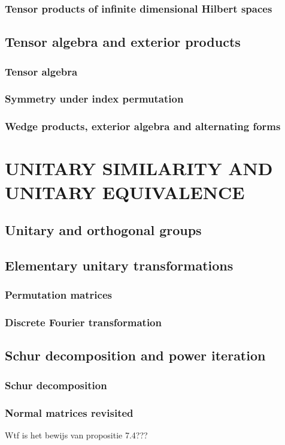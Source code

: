\documentclass[a4paper,twoside]{article}
\theoremstyle{definition}
\theoremstyle{plain}
\begin{document}
\subsubsection{Tensor products of infinite dimensional Hilbert spaces}
\subsection{Tensor algebra and exterior products}
\subsubsection{Tensor algebra}
\subsubsection{Symmetry under index permutation}
\subsubsection{Wedge products, exterior algebra and alternating forms}

\section{UNITARY SIMILARITY AND UNITARY EQUIVALENCE}
\subsection{Unitary and orthogonal groups}
\subsection{Elementary unitary transformations}
\subsubsection{Permutation matrices}
\subsubsection{Discrete Fourier transformation}
\subsection{Schur decomposition and power iteration}
\subsubsection{Schur decomposition}
\subsubsection{Normal matrices revisited}
Wtf is het bewijs van propositie 7.4???
\end{document}
